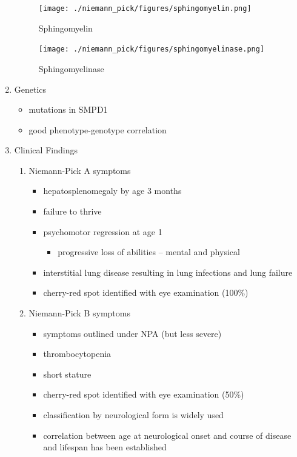 \documentclass{scrartcl}
\begin{document}
\begin{enumerate}
\begin{figure}[htbp]
\centering
\texttt{[image: ./niemann\_pick/figures/sphingomyelin.png]}
\caption{\label{fig:orgf18d1aa}
Sphingomyelin}
\end{figure}

\begin{figure}[htbp]
\centering
\texttt{[image: ./niemann\_pick/figures/sphingomyelinase.png]}
\caption{\label{fig:org3691d31}
Sphingomyelinase}
\end{figure}

\item Genetics
\label{sec:org74db7e6}
\begin{itemize}
\item mutations in SMPD1
\item good phenotype-genotype correlation
\end{itemize}

\item Clinical Findings
\label{sec:org18a071d}
\begin{enumerate}
\item Niemann-Pick A symptoms
\label{sec:orgccf4fbe}
\begin{itemize}
\item hepatosplenomegaly by age 3 months
\item failure to thrive
\item psychomotor regression at age 1
\begin{itemize}
\item progressive loss of abilities – mental and physical
\end{itemize}
\item interstitial lung disease resulting in lung infections and lung failure
\item cherry-red spot identified with eye examination (100\%)
\end{itemize}

\item Niemann-Pick B symptoms
\label{sec:org5d6c9c1}
\begin{itemize}
\item symptoms outlined under NPA (but less severe)
\item thrombocytopenia
\item short stature
\item cherry-red spot identified with eye examination (50\%)
\item classification by neurological form is widely used
\item correlation between age at neurological onset and course of disease
and lifespan has been established
\end{itemize}
\end{enumerate}


\end{enumerate}
\end{document}
